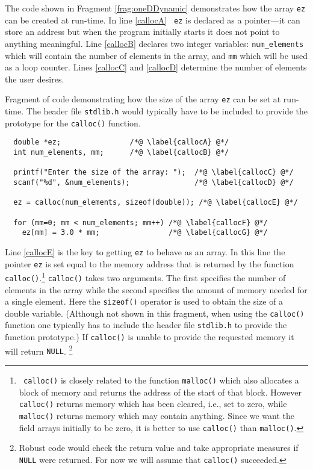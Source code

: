 The code shown in Fragment \ref{frag:oneDDynamic} demonstrates how the
array {\tt ez} can be created at run-time.  In line \ref{callocA} {\tt
ez} is declared as a pointer---it can store an address but when the
program initially starts it does not point to anything meaningful.
Line \ref{callocB} declares two integer variables: {\tt num\_elements}
which will contain the number of elements in the array, and {\tt mm}
which will be used as a loop counter.  Lines \ref{callocC} and
\ref{callocD} determine the number of elements the user desires.

\begin{fragment}
Fragment of code demonstrating how the size of the array {\tt ez} can
be set at run-time.  The header file {\tt stdlib.h} would typically
have to be included to provide the prototype for the {\tt calloc()}
function. \label{frag:oneDDynamic}
\codemiddle
\begin{lstlisting}
  double *ez;                /*@ \label{callocA} @*/
  int num_elements, mm;      /*@ \label{callocB} @*/

  printf("Enter the size of the array: ");  /*@ \label{callocC} @*/
  scanf("%d", &num_elements);               /*@ \label{callocD} @*/

  ez = calloc(num_elements, sizeof(double)); /*@ \label{callocE} @*/

  for (mm=0; mm < num_elements; mm++) /*@ \label{callocF} @*/
    ez[mm] = 3.0 * mm;                /*@ \label{callocG} @*/
\end{lstlisting}
\end{fragment}

Line \ref{callocE} is the key to getting {\tt ez} to behave as an
array.  In this line the pointer {\tt ez} is set equal to the memory
address that is returned by the function {\tt calloc()}.\footnote{{\tt
calloc()} is closely related to the function {\tt malloc()} which also
allocates a block of memory and returns the address of the start of
that block.  However {\tt calloc()} returns memory which has been
cleared, i.e., set to zero, while {\tt malloc()} returns memory which
may contain anything.  Since we want the field arrays initially to be
zero, it is better to use {\tt calloc()} than {\tt malloc()}.}
 {\tt calloc()} takes two arguments.  The
first specifies the number of elements in the array while the
second specifies the amount of memory needed for a single
element.  Here the {\tt sizeof()} operator is used to obtain the size
of a double variable.  (Although not shown in this fragment, when
using the {\tt calloc()} function one typically has to include the
header file {\tt stdlib.h} to provide the function prototype.)  If
{\tt calloc()} is unable to provide the requested memory it will
return {\tt NULL}.
\footnote{Robust code would check the return value and take appropriate
measures if {\tt NULL} were returned.  For now we will assume that
{\tt calloc()} succeeded.}

